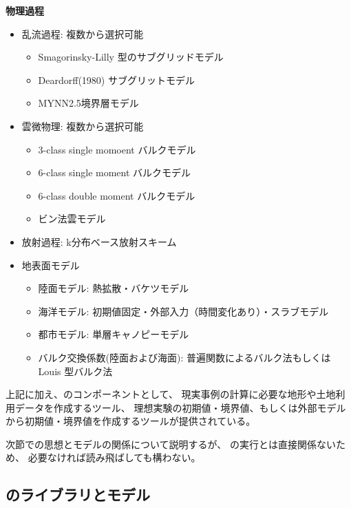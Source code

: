 {\bf 物理過程}
\begin{itemize}
 \item 乱流過程: 複数から選択可能
   \begin{itemize}
    \item Smagorinsky-Lilly 型のサブグリッドモデル \citep{smagorinsky_1963,lilly_1962,Brown_etal_1994,Scotti_1993}
    \item Deardorff(1980) サブグリットモデル \citep{Deardorff_1980}
    \item MYNN2.5境界層モデル \citep{my_1982,nakanishi_2004}
   \end{itemize}
 \item 雲微物理: 複数から選択可能
   \begin{itemize}
    \item 3-class single momoent バルクモデル\citep{kessler_1969}
    \item 6-class single moment バルクモデル \citep{tomita_2008}
    \item 6-class double moment バルクモデル \citep{sn_2014}
    \item ビン法雲モデル \citep{suzuki_etal_2010}
   \end{itemize}
 \item 放射過程: k分布ベース放射スキーム\citep{sekiguchi_2008}
 \item 地表面モデル
  \begin{itemize}
   \item 陸面モデル: 熱拡散・バケツモデル
   \item 海洋モデル: 初期値固定・外部入力（時間変化あり）・スラブモデル
   \item 都市モデル: 単層キャノピーモデル \citep{kusaka_2001}
   \item バルク交換係数(陸面および海面): 普遍関数によるバルク法\citep{beljaars_1991,wilson_2001}もしくは Louis 型バルク法\citep{uno_1995}
  \end{itemize}
\end{itemize}

上記に加え、\scalerm のコンポーネントとして、
現実事例の計算に必要な地形や土地利用データを作成するツール、
理想実験の初期値・境界値、もしくは外部モデルから初期値・境界値を作成するツールが提供されている。

次節で\scalelib の思想とモデルの関係について説明するが、
\scalerm の実行とは直接関係ないため、
必要なければ読み飛ばしても構わない。


\subsection{\scalelib のライブラリとモデル} \label{subsec:scalelib_model}

